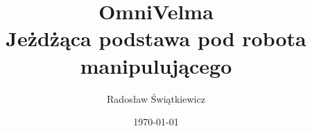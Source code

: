 \documentclass[a4paper]{report}
\begin{document}
\title{OmniVelma\\Jeżdżąca podstawa pod robota manipulującego}
\author{Radosław Świątkiewicz}
\date{\today}
\maketitle

\tableofcontents


\end{document}

